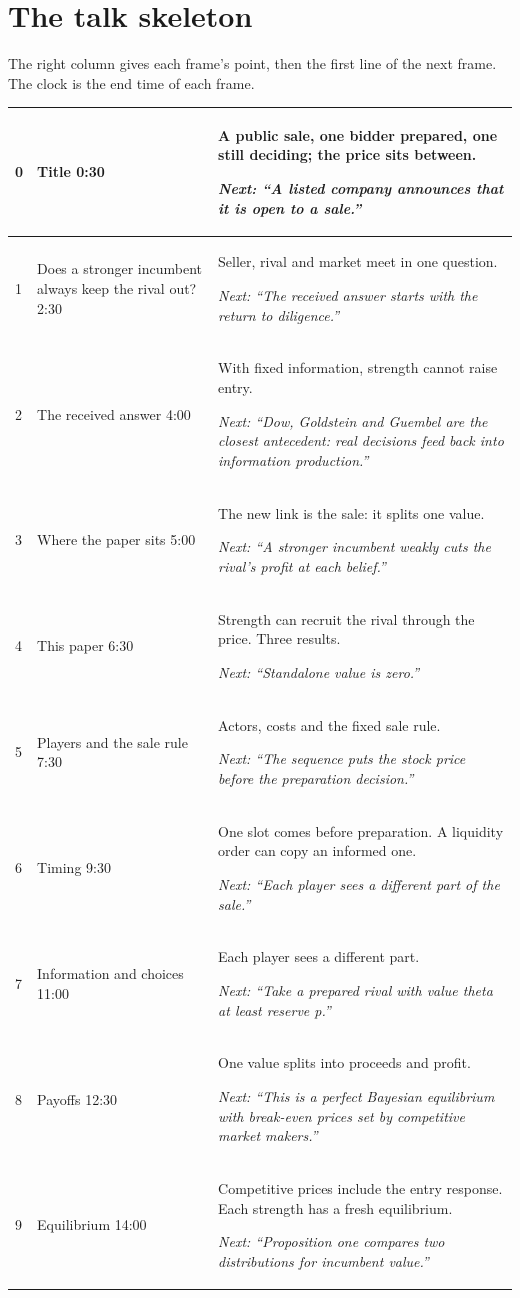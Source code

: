 \documentclass[10.5pt]{article}
\makeatletter
\newenvironment{cards}{\begin{longtable}{@{}IQA@{}}}{\end{longtable}}
\newcommand{\card}[3]{#1 & #2 & #3\\\midrule}
\makeatother
\begin{document}
\section{The talk skeleton}
The right column gives each frame's point, then the first line of the next frame. The clock is the end time of each frame.
\begin{cards}
\card{0}{Title \hfill 0:30}{A public sale, one bidder prepared, one still deciding; the price sits between.\par\textit{Next: ``A listed company announces that it is open to a sale.''}}
\card{1}{Does a stronger incumbent always keep the rival out? \hfill 2:30}{Seller, rival and market meet in one question.\par\textit{Next: ``The received answer starts with the return to diligence.''}}
\card{2}{The received answer \hfill 4:00}{With fixed information, strength cannot raise entry.\par\textit{Next: ``Dow, Goldstein and Guembel are the closest antecedent: real decisions feed back into information production.''}}
\card{3}{Where the paper sits \hfill 5:00}{The new link is the sale: it splits one value.\par\textit{Next: ``A stronger incumbent weakly cuts the rival's profit at each belief.''}}
\card{4}{This paper \hfill 6:30}{Strength can recruit the rival through the price. Three results.\par\textit{Next: ``Standalone value is zero.''}}
\card{5}{Players and the sale rule \hfill 7:30}{Actors, costs and the fixed sale rule.\par\textit{Next: ``The sequence puts the stock price before the preparation decision.''}}
\card{6}{Timing \hfill 9:30}{One slot comes before preparation. A liquidity order can copy an informed one.\par\textit{Next: ``Each player sees a different part of the sale.''}}
\card{7}{Information and choices \hfill 11:00}{Each player sees a different part.\par\textit{Next: ``Take a prepared rival with value theta at least reserve p.''}}
\card{8}{Payoffs \hfill 12:30}{One value splits into proceeds and profit.\par\textit{Next: ``This is a perfect Bayesian equilibrium with break-even prices set by competitive market makers.''}}
\card{9}{Equilibrium \hfill 14:00}{Competitive prices include the entry response. Each strength has a fresh equilibrium.\par\textit{Next: ``Proposition one compares two distributions for incumbent value.''}}

\end{cards}
\end{document}
